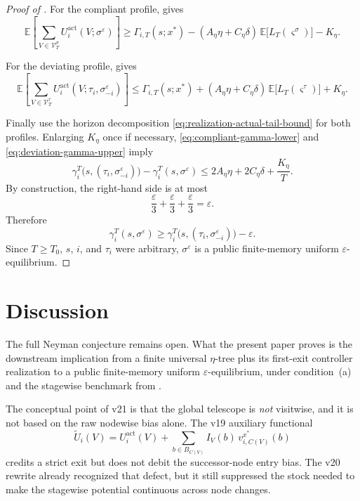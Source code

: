 \documentclass[12pt]{article}
\theoremstyle{definition}
\newcommand{\eps}{\varepsilon}
\newcommand{\E}{\mathbb{E}}
\newcommand{\1}{\mathbf{1}}
\begin{document}
\begin{proof}[Proof of ]
For the compliant profile,  gives
\begin{equation}
\label{eq:compliant-gamma-lower}
\E\left[
\sum_{V\in\mathcal V_T^\sigma}
U_i^{\mathrm{act}}(V;\sigma^\eps)
\right]
\ge
\Gamma_{i,T}(s;x^*)
-
(A_\eta\eta+C_\eta\delta)\,\E\bigl[L_T(\varsigma^\sigma)\bigr]
-
K_\eta.
\end{equation}

For the deviating profile,  gives
\begin{equation}
\label{eq:deviation-gamma-upper}
\E\left[
\sum_{V\in\mathcal V_T^\tau}
U_i^{\mathrm{act}}(V;\tau_i,\sigma^\eps_{-i})
\right]
\le
\Gamma_{i,T}(s;x^*)
+
(A_\eta\eta+C_\eta\delta)\,\E\bigl[L_T(\varsigma^\tau)\bigr]
+
K_\eta.
\end{equation}

Finally use the horizon decomposition \eqref{eq:realization-actual-tail-bound}
for both profiles. Enlarging $K_\eta$ once if necessary,
\eqref{eq:compliant-gamma-lower} and \eqref{eq:deviation-gamma-upper}
imply
\[
\gamma_i^T\bigl(s,(\tau_i,\sigma^\eps_{-i})\bigr)
-
\gamma_i^T(s,\sigma^\eps)
\le
2A_\eta\eta + 2C_\eta\delta + \frac{K_\eta}{T}.
\]
By construction, the right-hand side is at most
\[
\frac{\eps}{3}+\frac{\eps}{3}+\frac{\eps}{3}=\eps.
\]
Therefore
\[
\gamma_i^T(s,\sigma^\eps)
\ge
\gamma_i^T\bigl(s,(\tau_i,\sigma^\eps_{-i})\bigr)-\eps.
\]
Since $T\ge T_0$, $s$, $i$, and $\tau_i$ were arbitrary, $\sigma^\eps$ is a
public finite-memory uniform $\eps$-equilibrium.
\end{proof}



\section{Discussion}

The full Neyman conjecture remains open. What the present paper proves is the
downstream implication from a finite universal $\eta$-tree plus its first-exit
controller realization to a public finite-memory uniform $\eps$-equilibrium,
under condition~\textnormal{(a)} and the stagewise benchmark from
.

The conceptual point of v21 is that the global telescope is \emph{not}
visitwise, and it is not based on the raw nodewise bias alone. The v19 auxiliary
functional
\[
\widetilde U_i(V)
=
U_i^{\mathrm{act}}(V)
+
\sum_{b\in B_{C(V)}}I_V(b)\,v_{i,C(V)}^{x^*}(b)
\]
credits a strict exit but does not debit the successor-node entry bias. The v20
rewrite already recognized that defect, but it still suppressed the stock needed
to make the stagewise potential continuous across node changes.
\end{document}
